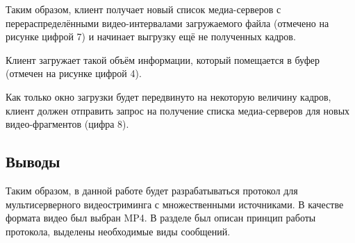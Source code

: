 Таким образом, клиент получает новый список медиа-серверов с перераспределёнными видео-интервалами загружаемого файла (отмечено на рисунке цифрой 7) и начинает выгрузку ещё не полученных кадров. 

Клиент загружает такой объём информации, который помещается в буфер (отмечен на рисунке цифрой 4). 

Как только окно загрузки будет передвинуто на некоторую величину кадров, клиент должен отправить запрос на получение списка медиа-серверов для новых видео-фрагментов (цифра 8). \\

\subsection*{Выводы}
Таким образом, в данной работе будет разрабатываться протокол для мультисерверного видеостриминга с множественными источниками. В качестве формата видео был выбран MP4. В разделе был описан принцип работы протокола, выделены необходимые виды сообщений. 

















